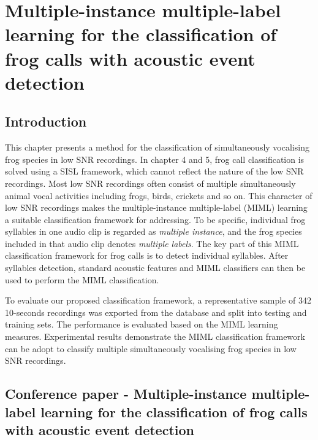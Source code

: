 
\chapter{Multiple-instance multiple-label learning for the classification of frog calls with acoustic event detection}
\label{cha:cha6MIML}


\section{Introduction}
\label{sec:intro}

This chapter presents a method for the classification of simultaneously vocalising frog species in low SNR recordings. In chapter 4 and 5, frog call classification is solved using a SISL framework, which cannot reflect the nature of the low SNR recordings. Most low SNR recordings often 
consist of multiple simultaneously animal vocal activities including frogs, birds, crickets and so on. This character of low SNR recordings makes the multiple-instance multiple-label (MIML) learning a suitable classification framework for addressing. 
To be specific, individual frog syllables in one audio clip is regarded as \textit{multiple instance}, and the frog species included in that audio clip denotes \textit{multiple labels}. 
The key part of this MIML classification framework for frog calls is to detect individual syllables. After syllables detection, standard acoustic features and MIML classifiers can then be used to perform the MIML classification.


To evaluate our proposed classification framework, a representative sample of 342 10-seconds recordings was exported from the database and split into testing and training sets. The performance is evaluated based on the MIML learning measures. Experimental results demonstrate the MIML classification framework can be adopt to classify multiple simultaneously vocalising frog species in low SNR recordings.


\section{Conference paper - Multiple-instance multiple-label learning for the classification of frog calls with acoustic event detection}



